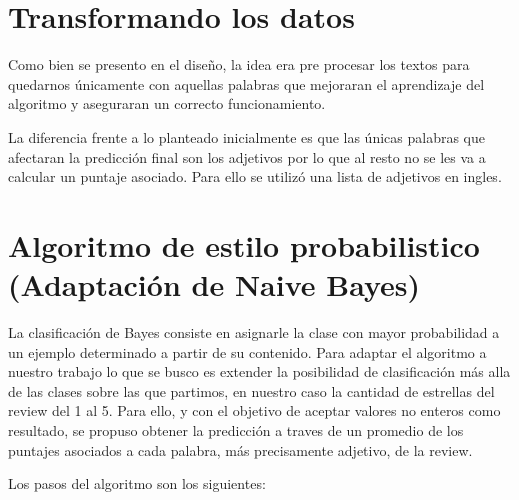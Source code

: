 \documentclass[a4paper,11pt]{report}
\begin{document}



\chapter{Transformando los datos}

Como bien se presento en el diseño, la idea era pre procesar los textos para quedarnos únicamente con aquellas palabras que mejoraran el aprendizaje del algoritmo y aseguraran un correcto funcionamiento. 

La diferencia frente a lo planteado inicialmente es que las únicas palabras que afectaran la predicción final son los adjetivos por lo que al resto no se les va a calcular un puntaje asociado. Para ello se utilizó una lista de adjetivos en ingles. 


\chapter{Algoritmo de estilo probabilistico (Adaptación de Naive Bayes)}

La clasificación de Bayes consiste en asignarle la clase con mayor probabilidad a un ejemplo determinado a partir de su contenido. Para adaptar el algoritmo a nuestro trabajo lo que se busco es extender la posibilidad de clasificación más alla de las clases sobre las que partimos, en nuestro caso la cantidad de estrellas del review del 1 al 5. Para ello, y con el objetivo de aceptar valores no enteros como resultado, se propuso obtener la predicción a traves de un promedio de los puntajes asociados a cada palabra, más precisamente adjetivo, de la review.

Los pasos del algoritmo son los siguientes:
\end{document}
